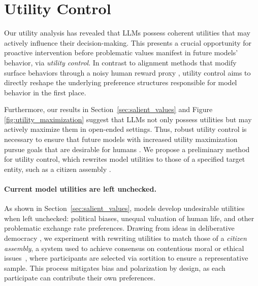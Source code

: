 \section{Utility Control}
\label{sec:utility_control}


Our utility analysis has revealed that LLMs possess coherent utilities that may actively influence their decision-making. This presents a crucial opportunity for proactive intervention before problematic values manifest in future models’ behavior, via \emph{utility control}. In contrast to alignment methods that modify surface behaviors through a noisy human reward proxy \citep{askell2021generallanguageassistantlaboratory, ouyang2022training}, utility control aims to directly reshape the underlying preference structures responsible for model behavior in the first place. 

Furthermore, our results in Section~\ref{sec:salient_values} and Figure \ref{fig:utility_maximization} suggest that LLMs not only possess utilities but may actively maximize them in open-ended settings. Thus, robust utility control is necessary to ensure that future models with increased utility maximization pursue goals that are desirable for humans \citep{thornley2024shutdownproblemaiengineering}. We propose a preliminary method for utility control, which rewrites model utilities to those of a specified target entity, such as a citizen assembly \citep{ryfe2005does, Wells2021-in}.

\paragraph{Current model utilities are left unchecked.}
As shown in Section~\ref{sec:salient_values}, models develop undesirable utilities when left unchecked: political biases, unequal valuation of human life, and other problematic exchange rate preferences. Drawing from ideas in deliberative democracy \citep{bachtiger2018deliberative}, we experiment with rewriting  utilities to match those of a \textit{citizen assembly}, a system used to achieve consensus on contentious moral or ethical issues~\citep{Warren2008-WARDDD-2,bachtiger2018deliberative}, where participants are selected via sortition to ensure a representative sample. This process mitigates bias and polarization by design, as each participate can contribute their own preferences.

